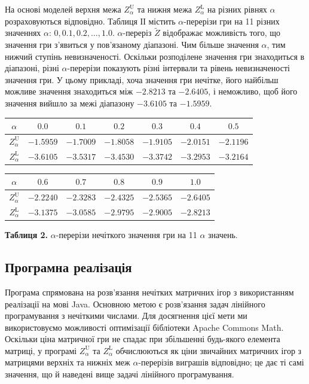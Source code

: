 \documentclass[14pt, a4paper, oneside]{extarticle}
\numberwithin{equation}{section}
\begin{document}
На основі моделей верхня межа $Z_{\alpha}^{\mathrm{U}}$ та нижня межа $Z_{\alpha}^{\mathrm{L}}$ на різних рівнях $\alpha$ розраховуються відповідно. Таблиця ІІ містить $\alpha$-перерізи гри на 11 різних значеннях $\alpha$: $0,0.1,0.2, \ldots, 1.0$. $\alpha$-переріз $\widetilde{Z}$ відображає можливість того, що значення гри з'явиться у пов'язаному діапазоні. Чим більше значення $\alpha$, тим нижчий ступінь невизначеності. Оскільки розподілене значення гри знаходиться в діапазоні, різні $\alpha$-перерізи показують різні інтервали та рівень невизначеності значення гри. У цьому прикладі, хоча значення гри нечітке, його найбільш можливе значення знаходиться між $-2.8213$ та $-2.6405$, і неможливо, щоб його значення вийшло за межі діапазону $-3.6105$ та $-1.5959$. 

\begin{center}
\begin{tabular}{|c|cccccc|}
\hline
$\alpha$ & $0.0$ & $0.1$ & $0.2$ & $0.3$ & $0.4$ & $0.5$ \\
\hline
$Z_{\alpha}^{\mathrm{U}}$ & $-1.5959$ & $-1.7009$ & $-1.8058$ & $-1.9105$ & $-2.0151$ & $-2.1196$ \\
$Z_{\alpha}^{\mathrm{L}}$ & $-3.6105$ & $-3.5317$ & $-3.4530$ & $-3.3742$ & $-3.2953$ & $-3.2164$ \\
\hline
\end{tabular}
\end{center}
\begin{center}
\begin{tabular}{|c|ccccc|}
\hline
$\alpha$ & $0.6$ & $0.7$ & $0.8$ & $0.9$ & $1.0$ \\
\hline
$Z_{\alpha}^{\mathrm{U}}$ & $-2.2240$ & $-2.3283$ & $-2.4325$ & $-2.5365$ & $-2.6405$ \\
$Z_{\alpha}^{\mathrm{L}}$ & $-3.1375$ & $-3.0585$ & $-2.9795$ & $-2.9005$ & $-2.8213$ \\
\hline
\end{tabular}
\end{center}

\begin{center}
    \textbf{Таблиця 2.} $\alpha$-перерізи нечіткого значення гри на 11 $\alpha$ значень.
\end{center}

\subsection{Програмна реалізація}

Програма спрямована на розв'язання нечітких матричних ігор з використанням реалізації на мові Java. Основною метою є розв'язання задач лінійного програмування з нечіткими числами. Для досягнення цієї мети ми використовуємо можливості оптимізації бібліотеки Apache Commons Math. Оскільки ціна матричної гри не спадає при збільшенні будь-якого елемента матриці, у програмі $Z_{\alpha}^{\mathrm{U}}$ та $Z_{\alpha}^{\mathrm{L}}$ обчислюються як ціни звичайних матричних ігор з матрицями верхніх та нижніх меж $\alpha$-перерізів виграшів відповідно; це дає ті самі значення, що й наведені вище задачі лінійного програмування.
\end{document}
